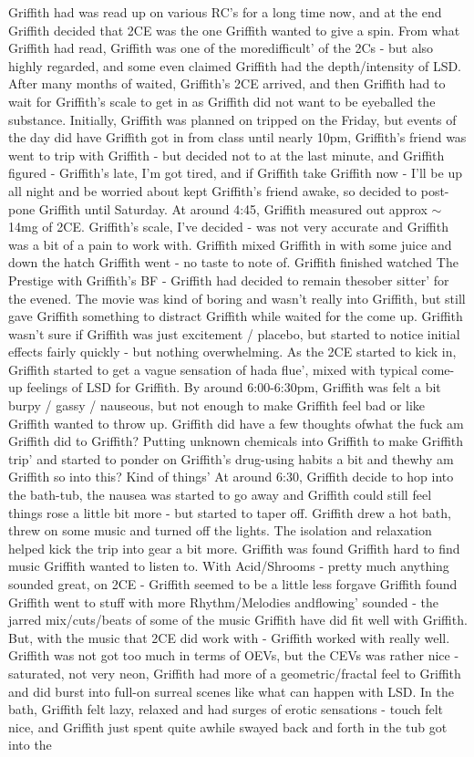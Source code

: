 \documentclass[12pt]{book}
\begin{document}
Griffith had was read up on various RC's for a long time now, and at the end Griffith decided that 2CE was the one Griffith wanted to give a spin. From what Griffith had read, Griffith was one of the moredifficult' of the 2Cs - but also highly regarded, and some even claimed Griffith had the depth/intensity of LSD. After many months of waited, Griffith's 2CE arrived, and then Griffith had to wait for Griffith's scale to get in as Griffith did not want to be eyeballed the substance. Initially, Griffith was planned on tripped on the Friday, but events of the day did have Griffith got in from class until nearly 10pm, Griffith's friend was went to trip with Griffith - but decided not to at the last minute, and Griffith figured - Griffith's late, I'm got tired, and if Griffith take Griffith now - I'll be up all night and be worried about kept Griffith's friend awake, so decided to post-pone Griffith until Saturday. At around 4:45, Griffith measured out approx $\sim$14mg of 2CE. Griffith's scale, I've decided - was not very accurate and Griffith was a bit of a pain to work with. Griffith mixed Griffith in with some juice and down the hatch Griffith went - no taste to note of. Griffith finished watched The Prestige with Griffith's BF - Griffith had decided to remain thesober sitter' for the evened. The movie was kind of boring and wasn't really into Griffith, but still gave Griffith something to distract Griffith while waited for the come up. Griffith wasn't sure if Griffith was just excitement / placebo, but started to notice initial effects fairly quickly - but nothing overwhelming. As the 2CE started to kick in, Griffith started to get a vague sensation of hada flue', mixed with typical come-up feelings of LSD for Griffith. By around 6:00-6:30pm, Griffith was felt a bit burpy / gassy / nauseous, but not enough to make Griffith feel bad or like Griffith wanted to throw up. Griffith did have a few thoughts ofwhat the fuck am Griffith did to Griffith? Putting unknown chemicals into Griffith to make Griffith trip' and started to ponder on Griffith's drug-using habits a bit and thewhy am Griffith so into this? Kind of things' At around 6:30, Griffith decide to hop into the bath-tub, the nausea was started to go away and Griffith could still feel things rose a little bit more - but started to taper off. Griffith drew a hot bath, threw on some music and turned off the lights. The isolation and relaxation helped kick the trip into gear a bit more. Griffith was found Griffith hard to find music Griffith wanted to listen to. With Acid/Shrooms - pretty much anything sounded great, on 2CE - Griffith seemed to be a little less forgave Griffith found Griffith went to stuff with more Rhythm/Melodies andflowing' sounded - the jarred mix/cuts/beats of some of the music Griffith have did fit well with Griffith. But, with the music that 2CE did work with - Griffith worked with really well. Griffith was not got too much in terms of OEVs, but the CEVs was rather nice - saturated, not very neon, Griffith had more of a geometric/fractal feel to Griffith and did burst into full-on surreal scenes like what can happen with LSD. In the bath, Griffith felt lazy, relaxed and had surges of erotic sensations - touch felt nice, and Griffith just spent quite awhile swayed back and forth in the tub got into the 
\end{document}
